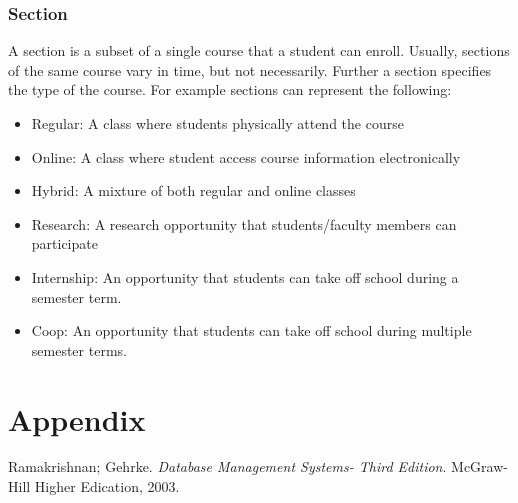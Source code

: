 \documentclass{article}
\begin{document}
  \subsubsection{Section}\label{sec:Requirements:Groups:Section}
    A section is a subset of a single course that a student can enroll.  Usually, sections of the same course vary in time, but not necessarily.  Further a section specifies the type of the course.  For example sections can represent the following:
    \begin{itemize}
      \item Regular: A class where students physically attend the course
      \item Online: A class where student access course information electronically
      \item Hybrid: A mixture of both regular and online classes
      \item Research: A research opportunity that students/faculty members can participate
      \item Internship: An opportunity that students can take off school during a semester term.
      \item Coop: An opportunity that students can take off school during multiple semester terms.
    \end{itemize}

    \newpage


  \section{Appendix}\label{sec:Appendix}

  \medskip


  \begin{thebibliography}{1}

    Ramakrishnan; Gehrke.
    \textit{Database Management Systems- Third Edition}.
    McGraw-Hill Higher Edication, 2003.

  \end{thebibliography}
\end{document}
